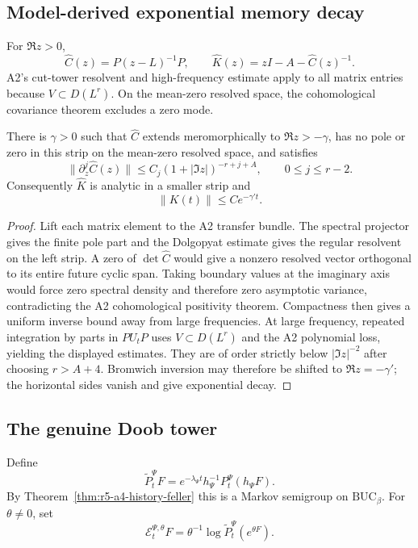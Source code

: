 \subsection{Model-derived exponential memory decay}

For \(\Re z>0\),
\[
 \widehat C(z)=P(z-L)^{-1}P,
 \qquad
 \widehat K(z)=zI-A-\widehat C(z)^{-1}.
\]
A2's cut-tower resolvent and high-frequency estimate apply to all matrix
entries because \(V\subset D(L^r)\).  On the mean-zero resolved space, the
cohomological covariance theorem excludes a zero mode.

\begin{theorem}
\label{thm:r5-a4-memory-decay}
There is \(\gamma>0\) such that \(\widehat C\) extends meromorphically to
\(\Re z> -\gamma\), has no pole or zero in this strip on the mean-zero
resolved space, and satisfies
\[
 \|\partial_z^j\widehat C(z)\|
 \le C_j(1+|\Im z|)^{-r+j+A},
 \qquad 0\le j\le r-2.
\]
Consequently \(\widehat K\) is analytic in a smaller strip and
\[
 \|K(t)\|\le Ce^{-\gamma' t}.
\]
\end{theorem}

\begin{proof}
Lift each matrix element to the A2 transfer bundle.  The spectral projector
gives the finite pole part and the Dolgopyat estimate gives the regular
resolvent on the left strip.  A zero of \(\det\widehat C\) would give a
nonzero resolved vector orthogonal to its entire future cyclic span.  Taking
boundary values at the imaginary axis would force zero spectral density and
therefore zero asymptotic variance, contradicting the A2 cohomological
positivity theorem.  Compactness then gives a uniform inverse bound away from
large frequencies.  At large frequency, repeated integration by parts in
\(PU_tP\) uses \(V\subset D(L^r)\) and the A2 polynomial loss, yielding the
displayed estimates.  They are of order strictly below \(|\Im z|^{-2}\) after
choosing \(r>A+4\).  Bromwich inversion may therefore be shifted to
\(\Re z=-\gamma'\); the horizontal sides vanish and give exponential decay.
\end{proof}

\subsection{The genuine Doob tower}

Define
\[
 \widetilde P_t^\Psi F
 =e^{-\lambda_\Psi t}h_\Psi^{-1}P_t^\Psi(h_\Psi F).
\]
By Theorem~\ref{thm:r5-a4-history-feller} this is a Markov semigroup on
\(\mathrm{BUC}_\beta\).  For \(\theta\ne0\), set
\[
 \mathcal E_t^{\Psi,\theta}F
 =\theta^{-1}\log\widetilde P_t^\Psi(e^{\theta F}).
\]

